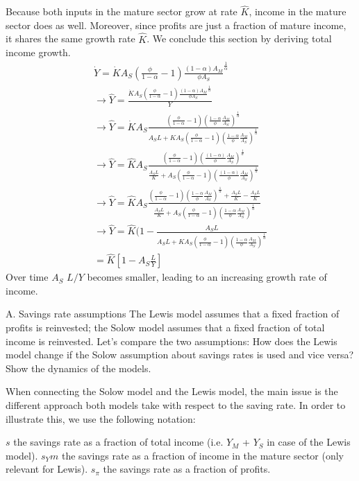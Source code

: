 \documentclass[a4paper]{article}
\begin{document}
Because both inputs in the mature sector grow at rate $\hat{K}$, income in the mature sector does as well. Moreover, since profits are just a fraction of mature income, it shares the same growth rate $\hat{K}$. We conclude this section by deriving total income growth.
\begin{align}
\dot{Y}=\dot{K} A_S (\frac{\phi}{1-\alpha}-1)\frac{(1-\alpha) A_M}{\phi A_S}^{\frac{1}{\alpha}} \nonumber \\
\rightarrow \hat{Y} =\frac{\dot{K} A_S (\frac{\phi}{1-\alpha}-1)\frac{(1-\alpha)A_M}{\phi A_S}^{\frac{1}{\alpha}}}{Y} \nonumber \\
\rightarrow \hat{Y} =\dot{K} A_S \frac{(\frac{\phi}{1-\alpha}-1)(\frac{1-\alpha}{\phi} \frac{A_M}{A_S} )^{\frac{1}{\alpha}}}{A_S L+K A_S (\frac{\phi}{1-\alpha}-1)(\frac{1-\alpha}{\phi} \frac{A_M}{A_S} )^{\frac{1}{\alpha}}} \nonumber \\
\rightarrow \hat{Y} =\hat{K} A_S \frac{(\frac{\phi}{1-\alpha}-1)(\frac{(1-\alpha)}{\phi}  \frac{A_M}{A_S} )^{\frac{1}{\alpha}}}{\frac{A_S L}{K}+A_S (\frac{\phi}{1-\alpha}-1)(\frac{(1-\alpha)}{\phi}  \frac{A_M}{A_S})^{\frac{1}{\alpha}}} \nonumber \\
\rightarrow \hat{Y} =\hat{K} A_S \frac{(\frac{\phi}{1-\alpha}-1)(\frac{1-\alpha}{\phi}  \frac{A_M}{A_S}) ^{\frac{1}{\alpha}}+\frac{A_S L}{K}-\frac{A_S L}{K}}{\frac{A_S L}{K}+A_S (\frac{\phi}{1-\alpha}-1)(\frac{1-\alpha}{\phi}  \frac{A_M}{A_S})^{\frac{1}{\alpha}}} \nonumber \\
\rightarrow \hat{Y} =\hat{K} (1-\frac{A_S L}{A_S L+K A_S (\frac{\phi}{1-\alpha}-1)(\frac{1-\alpha}{\phi}  \frac{A_M}{A_S})^{\frac{1}{\alpha}}} \nonumber \\
= \hat{K} [1- A_S \frac{L}{Y}]
\end{align}
Over time $A_S$ $L/Y$ becomes smaller, leading to an increasing growth rate of income.


A. Savings rate assumptions
The Lewis model assumes that a fixed fraction of profits is reinvested; the Solow model assumes that a fixed fraction of total income is reinvested. Let’s compare the two assumptions: How does the Lewis model change if the Solow assumption about savings rates is used and vice versa? Show the dynamics of the models.

When connecting the Solow model and the Lewis model, the main issue is the different approach both models take with respect to the saving rate. In order to illustrate this, we use the following notation:

$s$	the savings rate as a fraction of total income (i.e. $Y_M$ + $Y_S$ in case of the Lewis model).
$s_Ym$	the savings rate as a fraction of income in the mature sector (only relevant for Lewis).
$s_\pi$	the savings rate as a fraction of profits.
\end{document}
